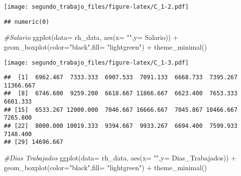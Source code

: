 \documentclass[
]{article}
\newenvironment{Shaded}{\begin{snugshade}}{\end{snugshade}}
\newcommand{\AttributeTok}[1]{\textcolor[rgb]{0.77,0.63,0.00}{#1}}
\newcommand{\CommentTok}[1]{\textcolor[rgb]{0.56,0.35,0.01}{\textit{#1}}}
\newcommand{\FunctionTok}[1]{\textcolor[rgb]{0.00,0.00,0.00}{#1}}
\newcommand{\NormalTok}[1]{#1}
\newcommand{\SpecialCharTok}[1]{\textcolor[rgb]{0.00,0.00,0.00}{#1}}
\newcommand{\StringTok}[1]{\textcolor[rgb]{0.31,0.60,0.02}{#1}}
\begin{document}
\texttt{[image: segundo\_trabajo\_files/figure-latex/C\_1-2.pdf]}

\begin{Shaded}
\end{Shaded}

\begin{verbatim}
## numeric(0)
\end{verbatim}

\begin{Shaded}
\begin{Highlighting}[]
\CommentTok{\#Salario}
\FunctionTok{ggplot}\NormalTok{(}\AttributeTok{data=}\NormalTok{ rh\_data, }\FunctionTok{aes}\NormalTok{(}\AttributeTok{x=} \StringTok{""}\NormalTok{,}\AttributeTok{y=}\NormalTok{ Salario)) }\SpecialCharTok{+} \FunctionTok{geom\_boxplot}\NormalTok{(}\AttributeTok{color=}\StringTok{"black"}\NormalTok{,}\AttributeTok{fill=} \StringTok{"lightgreen"}\NormalTok{) }\SpecialCharTok{+} 
\FunctionTok{theme\_minimal}\NormalTok{()}
\end{Highlighting}
\end{Shaded}

\texttt{[image: segundo\_trabajo\_files/figure-latex/C\_1-3.pdf]}

\begin{Shaded}
\end{Shaded}

\begin{verbatim}
##  [1]  6962.467  7333.333  6907.533  7091.133  6668.733  7395.267 11366.667
##  [8]  6746.600  9259.200  6618.667 11866.667  6623.400  7653.333  6601.333
## [15]  6533.267 12000.000  7046.667 16666.667  7045.867 10466.667  7265.800
## [22]  8000.000 10019.333  9394.667  9933.267  6694.400  7599.933  7148.400
## [29] 14696.667
\end{verbatim}

\begin{Shaded}
\begin{Highlighting}[]
\CommentTok{\#Dias Trabajados}
\FunctionTok{ggplot}\NormalTok{(}\AttributeTok{data=}\NormalTok{ rh\_data, }\FunctionTok{aes}\NormalTok{(}\AttributeTok{x=} \StringTok{""}\NormalTok{,}\AttributeTok{y=}\NormalTok{ Dias\_Trabajados)) }\SpecialCharTok{+} \FunctionTok{geom\_boxplot}\NormalTok{(}\AttributeTok{color=}\StringTok{"black"}\NormalTok{,}\AttributeTok{fill=} \StringTok{"lightgreen"}\NormalTok{) }\SpecialCharTok{+} 
\FunctionTok{theme\_minimal}\NormalTok{()}
\end{Highlighting}
\end{Shaded}
\end{document}
